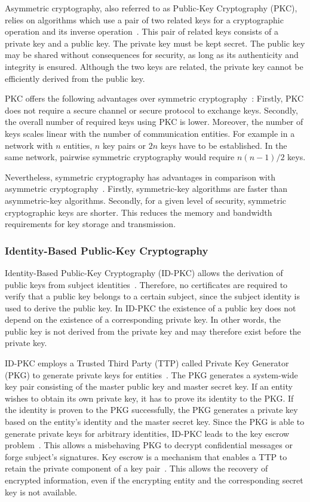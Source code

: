 Asymmetric cryptography, also referred to as Public-Key Cryptography (PKC), relies on algorithms which use a pair of two related keys for a cryptographic operation and its inverse operation~\cite{Barker2020,CNSS2022,Eckert2023}.
This pair of related keys consists of a private key and a public key.
The private key must be kept secret.
The public key may be shared without consequences for security, as long as its authenticity and integrity is ensured.
Although the two keys are related, the private key cannot be efficiently derived from the public key.

PKC offers the following advantages over symmetric cryptography~\cite{Barker2020,Eckert2023}:
Firstly, PKC does not require a secure channel or secure protocol to exchange keys.
Secondly, the overall number of required keys using PKC is lower.
Moreover, the number of keys scales linear with the number of communication entities.
For example in a network with $n$ entities, $n$ key pairs or $2n$ keys have to be established.
In the same network, pairwise symmetric cryptography would require $n(n-1)/2$ keys.

Nevertheless, symmetric cryptography has advantages in comparison with asymmetric cryptography~\cite{Barker2020}.
Firstly, symmetric-key algorithms are faster than asymmetric-key algorithms.
Secondly, for a given level of security, symmetric cryptographic keys are shorter.
This reduces the memory and bandwidth requirements for key storage and transmission.

\subsubsection{Identity-Based Public-Key Cryptography}
Identity-Based Public-Key Cryptography (ID-PKC) allows the derivation of public keys from subject identities~\cite{Shamir1985,Boneh2023}.
Therefore, no certificates are required to verify that a public key belongs to a certain subject, since the subject identity is used to derive the public key.
In ID-PKC the existence of a public key does not depend on the existence of a corresponding private key.
In other words, the public key is not derived from the private key and may therefore exist before the private key.

ID-PKC employs a Trusted Third Party (TTP) called Private Key Generator (PKG) to generate private keys for entities~\cite{AlRiyami2003,Boneh2023}.
The PKG generates a system-wide key pair consisting of the master public key and master secret key.
If an entity wishes to obtain its own private key, it has to prove its identity to the PKG.
If the identity is proven to the PKG successfully, the PKG generates a private key based on the entity's identity and the master secret key.
Since the PKG is able to generate private keys for arbitrary identities, ID-PKC leads to the key escrow problem~\cite{AlRiyami2003}.
This allows a misbehaving PKG to decrypt confidential messages or forge subject's signatures.
Key escrow is a mechanism that enables a TTP to retain the private component of a key pair~\cite{CNSS2021,Boneh2023}.
This allows the recovery of encrypted information, even if the encrypting entity and the corresponding secret key is not available.

